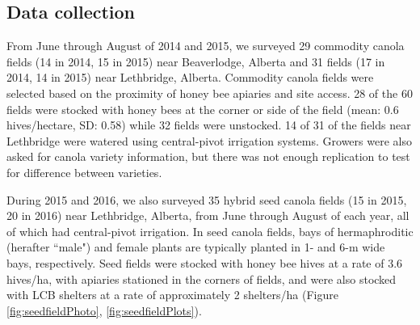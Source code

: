 \documentclass[12pt]{article} %
\begin{document}
\subsection*{Data collection}
From June through August of 2014 and 2015, we surveyed 29 commodity canola fields (14 in 2014, 15 in 2015) near Beaverlodge, Alberta and 31 fields (17 in 2014, 14 in 2015) near Lethbridge, Alberta.
Commodity canola fields were selected based on the proximity of honey bee apiaries and site access. 
28 of the 60 fields were stocked with honey bees at the corner or side of the field (mean: 0.6 hives/hectare, SD: 0.58) while 32 fields were unstocked. %
14 of 31 of the fields near Lethbridge were watered using central-pivot irrigation systems.
Growers were also asked for canola variety information, but there was not enough replication to test for difference between varieties.

During 2015 and 2016, we also surveyed 35 hybrid seed canola fields (15 in 2015, 20 in 2016) near Lethbridge, Alberta, from June through August of each year, all of which had central-pivot irrigation.
In seed canola fields, bays of hermaphroditic (herafter ``male") and female plants are typically planted in 1- and 6-m wide bays, respectively. 
Seed fields were stocked with honey bee hives at a rate of 3.6 hives/ha, with apiaries stationed in the corners of fields, and were also stocked with LCB shelters at a rate of approximately 2 shelters/ha (Figure \ref{fig:seedfieldPhoto}, \ref{fig:seedfieldPlots}). %
\end{document}
